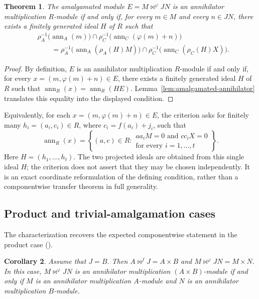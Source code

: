 \documentclass[11pt]{amsart}
\theoremstyle{plain}
\newtheorem{theorem}{Theorem}[section]
\newtheorem{corollary}[theorem]{Corollary}
\theoremstyle{definition}
\theoremstyle{remark}
\newcommand{\ann}{\operatorname{ann}}
\numberwithin{equation}{section}
\begin{document}
\begin{theorem}
\label{thm:amalgamated-characterization}
The amalgamated module $E=M\bowtie^\varphi JN$ is an annihilator multiplication
$R$-module if and only if, for every $m\in M$ and every $n\in JN$, there exists
a finitely generated ideal $H$ of $R$ such that
\[
\begin{aligned}
&\rho_A^{-1}\bigl(\ann_A(m)\bigr) \cap \rho_C^{-1}\bigl(\ann_C(\varphi(m)+n)\bigr) \\
&\qquad =\rho_A^{-1}\bigl(\ann_A(\rho_A(H)M)\bigr) \cap \rho_C^{-1}\bigl(\ann_C(\rho_C(H)X)\bigr).
\end{aligned}
\]
\end{theorem}

\begin{proof}
By definition, $E$ is an annihilator multiplication $R$-module if and only if,
for every $x=(m,\varphi(m)+n)\in E$, there exists a finitely generated ideal
$H$ of $R$ such that $\ann_R(x)=\ann_R(HE)$. Lemma~\ref{lem:amalgamated-annihilator}
translates this equality into the displayed condition.
\end{proof}

Equivalently, for each $x=(m,\varphi(m)+n)\in E$, the criterion asks for
finitely many $h_i=(a_i,c_i)\in R$, where $c_i=f(a_i)+j_i$, such that
\[
\ann_R(x)=
\left\{(a,c)\in R:\begin{array}{l}
 aa_iM=0\text{ and }cc_iX=0\\
 \text{for every }i=1,\ldots,t
\end{array}\right\}.
\]
Here $H=(h_1,\ldots,h_t)$. The two projected ideals are obtained from this
single ideal $H$; the criterion does not assert that they may be chosen
independently. It is an exact coordinate reformulation of the defining
condition, rather than a componentwise transfer theorem in full generality.

\subsection{Product and trivial-amalgamation cases}

The characterization recovers the expected componentwise statement in the
product case (\cite[Proposition 2]{KocAMM}).

\begin{corollary}
\label{cor:product-case}
Assume that $J=B$. Then $A\bowtie^fJ=A\times B$ and
$M\bowtie^\varphi JN=M\times N$. In this case, $M\bowtie^\varphi JN$ is an
annihilator multiplication $(A\times B)$-module if and only if $M$ is an
annihilator multiplication $A$-module and $N$ is an annihilator multiplication
$B$-module.
\end{corollary}
\end{document}
